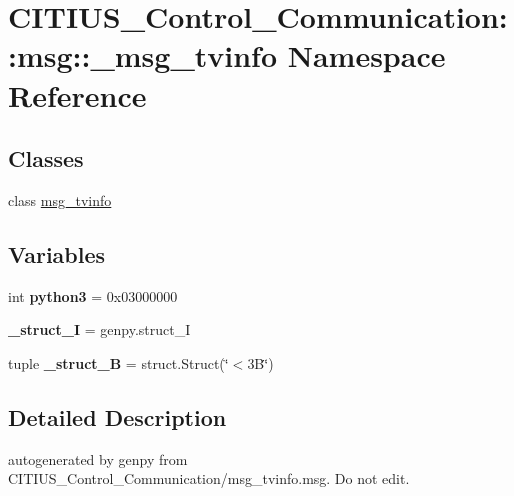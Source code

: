 \hypertarget{namespace_c_i_t_i_u_s___control___communication_1_1msg_1_1__msg__tvinfo}{\section{\-C\-I\-T\-I\-U\-S\-\_\-\-Control\-\_\-\-Communication\-:\-:msg\-:\-:\-\_\-msg\-\_\-tvinfo \-Namespace \-Reference}
\label{namespace_c_i_t_i_u_s___control___communication_1_1msg_1_1__msg__tvinfo}
}
\subsection*{\-Classes}
\begin{DoxyCompactItemize}
\item 
class \hyperlink{class_c_i_t_i_u_s___control___communication_1_1msg_1_1__msg__tvinfo_1_1msg__tvinfo}{msg\-\_\-tvinfo}
\end{DoxyCompactItemize}
\subsection*{\-Variables}
\begin{DoxyCompactItemize}
\item 
\hypertarget{namespace_c_i_t_i_u_s___control___communication_1_1msg_1_1__msg__tvinfo_a450897364bcea85c12b0b6931a1f63fe}{int {\bfseries python3} = 0x03000000}\label{namespace_c_i_t_i_u_s___control___communication_1_1msg_1_1__msg__tvinfo_a450897364bcea85c12b0b6931a1f63fe}

\item 
\hypertarget{namespace_c_i_t_i_u_s___control___communication_1_1msg_1_1__msg__tvinfo_aaefa6366d43675c6c39f28bbc8c6a822}{{\bfseries \-\_\-struct\-\_\-\-I} = genpy.\-struct\-\_\-\-I}\label{namespace_c_i_t_i_u_s___control___communication_1_1msg_1_1__msg__tvinfo_aaefa6366d43675c6c39f28bbc8c6a822}

\item 
\hypertarget{namespace_c_i_t_i_u_s___control___communication_1_1msg_1_1__msg__tvinfo_a344ed6157205ad5e5b86ef55bbb08d36}{tuple {\bfseries \-\_\-struct\-\_\-B} = struct.\-Struct(\char`\"{}$<$3\-B\char`\"{})}\label{namespace_c_i_t_i_u_s___control___communication_1_1msg_1_1__msg__tvinfo_a344ed6157205ad5e5b86ef55bbb08d36}

\end{DoxyCompactItemize}


\subsection{\-Detailed \-Description}
\begin{DoxyVerb}autogenerated by genpy from CITIUS_Control_Communication/msg_tvinfo.msg. Do not edit.\end{DoxyVerb}
 
